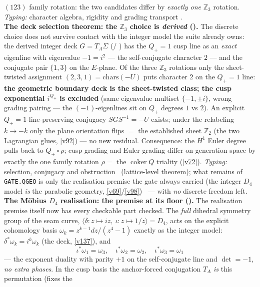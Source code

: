 \documentclass[11pt,a4paper]{article}
\newcommand{\Z}{\mathbb{Z}}
\theoremstyle{definition}
\begin{document}
\begin{keybox}
$(123)$ family rotation: the two candidates differ by \emph{exactly one} $\Z_3$ rotation. \emph{Typing:}
character algebra, rigidity and grading transport \mE.
\smallskip\\
\noindent\textbf{The deck selection theorem: the $\Z_3$ choice is \emph{derived}
().} The discrete choice does not survive contact with the integer model
the suite already owns: the derived integer deck $G=T_A\Sigma$ (/%
) has the $Q_+{=}1$ cusp line as an \emph{exact} eigenline with
eigenvalue $-1=i^2$ --- the self-conjugate character $2$ --- and the conjugate pair $\{1,3\}$ on the
$E$-plane. Of the three $\Z_3$ rotations only the sheet-twisted assignment $(2,3,1)=\mathrm{chars}(-U)$
puts character $2$ on the $Q_+{=}1$ line: \textbf{the geometric boundary deck is the sheet-twisted class;
the cusp exponential $i^{Q_+}$ is excluded} (same eigenvalue multiset $\{-1,\pm i\}$, wrong grading
pairing --- the $(-1)$-eigenlines sit on $Q_+$ degrees $1$ vs $2$). An explicit $Q_+{=}1$-line-preserving
conjugacy $SGS^{-1}=-U$ exists; under the relabeling $k\to-k$ only the plane orientation flips $=$ the
established sheet $\Z_2$ (the two Lagrangian glues, \vref{v92}) --- no new residual. Consequence: the
$H^1$ Euler degree pulls back to $Q_+\!\circ\rho$; cusp grading and Euler grading differ on generation
space by exactly the one family rotation $\rho=$ the $\operatorname{coker}Q$ triality (\vref{v72}).
\emph{Typing:} selection, conjugacy and obstruction \mE\ (lattice-level theorem); what remains of
\texttt{GATE.QGEO} is only the realisation premise the gate always carried (the integer $D_4$ model
\emph{is} the parabolic geometry, \vref{v69}/\vref{v98}) \mC\ --- with \emph{no} discrete freedom left.
\smallskip\\
\noindent\textbf{The M\"obius $D_4$ realisation: the premise at its floor
().} The realisation premise itself now has every checkable part checked.
The \emph{full} dihedral symmetry group of the seam curve, $\langle\delta\!:z\mapsto iz,\ \iota\!:z\mapsto
1/z\rangle=D_4$, acts on the explicit cohomology basis $\omega_k=z^{k-1}dz/(z^4{-}1)$ exactly as the
integer model: $\delta^*\omega_k=i^k\omega_k$ (the deck, \vref{v137}), and
\[
  \boxed{\ \iota^*\omega_1=\omega_3,\quad \iota^*\omega_2=\omega_2,\quad \iota^*\omega_3=\omega_1\ }
\]
--- the exponent duality with parity $+1$ on the self-conjugate line and $\det=-1$, \emph{no extra
phases}. In the cusp basis the anchor-forced conjugation $T_A$ \emph{is} this permutation (fixes the

\end{keybox}
\end{document}
